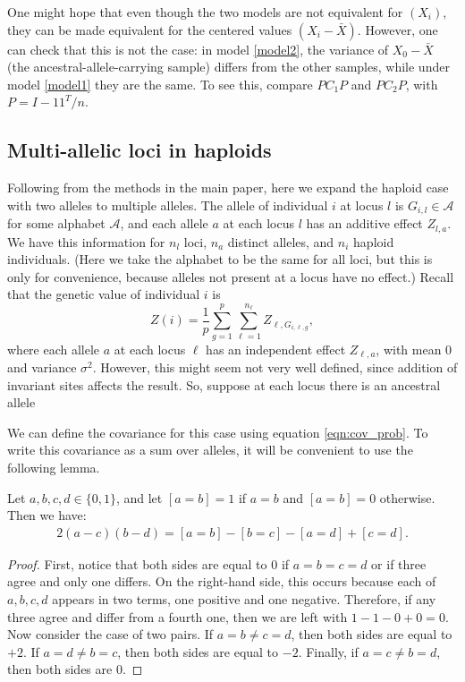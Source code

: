 One might hope that even though the two models are not equivalent for $(X_i)$,
they can be made equivalent for the centered values $(X_i - \bar X)$.
However, one can check that this is not the case:
in model \eqref{model2}, the variance of $X_0 - \bar X$ (the ancestral-allele-carrying sample)
differs from the other samples,
while under model \eqref{model1} they are the same.
To see this, compare $PC_1P$ and $PC_2P$, with $P = I - 11^T/n$.


\subsection{Multi-allelic loci in haploids}
\label{sec:multiallelic}

Following from the methods in the main paper, here we expand the haploid case with two alleles to multiple alleles.
%
The allele of individual $i$ at locus $l$ is $G_{i,l} \in \mathcal{A}$
for some alphabet $\mathcal{A}$,
and each allele $a$ at each locus $l$ has an additive effect $Z_{l,a}$.
%
We have this information for
$n_l$ loci,
$n_a$ distinct alleles, and
$n_i$ haploid individuals.
(Here we take the alphabet to be the same for all loci,
but this is only for convenience,
because alleles not present at a locus have no effect.)
Recall that the genetic value of individual $i$ is
$$
Z(i) = \frac{1}{p} \sum_{g=1}^p \sum_{\ell=1}^{n_\ell} Z_{\ell,G_{i,\ell,g}} ,
$$
where each allele $a$ at each locus $\ell$ has an independent effect
$Z_{\ell,a}$, with mean 0 and variance $\sigma^2$.
However, this might seem not very well defined,
since addition of invariant sites affects the result.
So, suppose at each locus there is an ancestral allele 


We can define the covariance for this case using equation \eqref{eqn:cov_prob}.
%
To write this covariance as a sum over alleles,
it will be convenient to use the following lemma.

\begin{lemma} \label{thm:equiv}
Let $a, b, c, d \in \{0,1\}$, and let $[a=b] = 1$ if $a=b$ and $[a=b] = 0$ otherwise.
%
Then we have:
\begin{align}
    2(a-c)(b-d) = [a=b] - [b=c] - [a=d] + [c=d].
\end{align}
\end{lemma}

\begin{proof}
First, notice that both sides are equal to 0
if $a=b=c=d$ or if three agree and only one differs.
%
On the right-hand side,
this occurs because each of $a,b,c,d$ appears in two terms,
one positive and one negative.
%
Therefore, if any three agree and differ from a fourth one,
then we are left with $1 - 1 - 0 + 0 = 0$.
%
Now consider the case of two pairs.
%
If $a=b \neq c=d$, then both sides are equal to $+2$.
%
If $a=d \neq b=c$, then both sides are equal to $-2$.
%
Finally, if $a=c \neq b=d$, then both sides are 0.
\end{proof}

